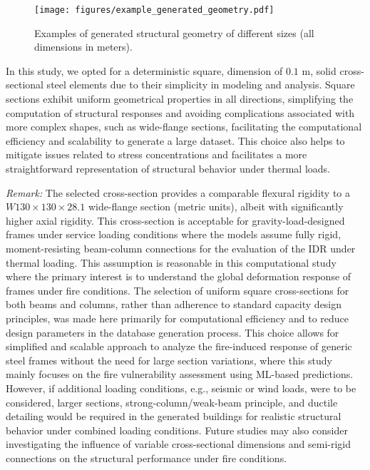 \begin{figure*}[h!]
    \centering
    \texttt{[image: figures/example\_generated\_geometry.pdf]}
    \caption{Examples of generated structural geometry of different sizes (all dimensions in meters).}
    \label{fig:example_generated_geometry} 
\end{figure*}

{\blockRevise

In this study, we opted for a deterministic square, dimension of $0.1$ m, solid cross-sectional steel elements due to their simplicity in modeling and analysis. Square sections exhibit uniform geometrical properties in all directions, simplifying the computation of structural responses and avoiding complications associated with more complex shapes, such as wide-flange sections, facilitating the computational efficiency and scalability to generate a large dataset. This choice also helps to mitigate issues related to stress concentrations and facilitates a more straightforward representation of structural behavior under thermal loads. 

\textit{Remark:} The selected cross-section provides a comparable flexural rigidity to a $W 130 \times 130 \times 28.1$ wide-flange section (metric units), albeit with significantly higher axial rigidity. This cross-section is acceptable for gravity-load-designed frames under service loading conditions where the models assume fully rigid, moment-resisting beam-column connections for the evaluation of the IDR under thermal loading. This assumption is reasonable in this computational study where the primary interest is to understand the global deformation response of frames under fire conditions. The selection of uniform square cross-sections for both beams and columns, rather than adherence to standard capacity design principles, was made here primarily for computational efficiency and to reduce design parameters in the database generation process. This choice allows for simplified and scalable approach to analyze the fire-induced response of generic steel frames without the need for large section variations, where this study mainly focuses on the fire vulnerability assessment using ML-based predictions. However, if additional loading conditions, e.g., seismic or wind loads, were to be considered, larger sections, strong-column/weak-beam principle, and ductile detailing would be required in the generated buildings for realistic structural behavior under combined loading conditions. Future studies may also consider investigating the influence of variable cross-sectional dimensions and semi-rigid connections on the structural performance under fire conditions. 
} %


